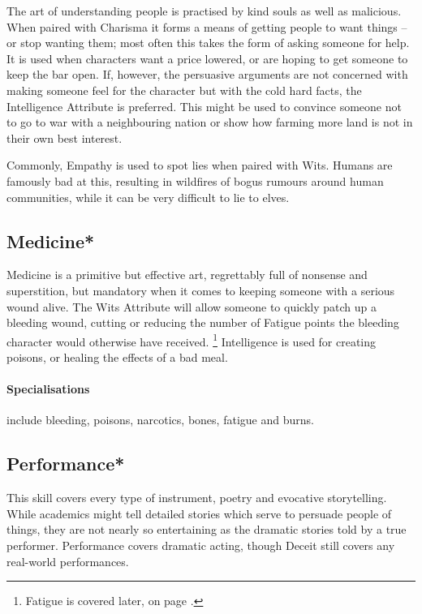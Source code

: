 \begin{multicols}{2}
The art of understanding people is practised by kind souls as well as malicious.
When paired with Charisma it forms a means of getting people to want things -- or stop wanting them; most often this takes the form of asking someone for help.
It is used when characters want a price lowered, or are hoping to get someone to keep the bar open.
If, however, the persuasive arguments are not concerned with making someone feel for the character but with the cold hard facts, the Intelligence Attribute is preferred.
This might be used to convince someone not to go to war with a neighbouring nation or show how farming more land is not in their own best interest.

Commonly, Empathy is used to spot lies when paired with Wits. Humans are famously bad at this, resulting in wildfires of bogus rumours around human communities, while it can be very difficult to lie to elves.

\subsection{Medicine*}

Medicine is a primitive but effective art, regrettably full of nonsense and superstition, but mandatory when it comes to keeping someone with a serious wound alive.
The Wits Attribute will allow someone to quickly patch up a bleeding wound, cutting or reducing the number of Fatigue points the bleeding character would otherwise have received.
\footnote{Fatigue is covered later, on page \pageref{fatigue}.}
Intelligence is used for creating poisons, or healing the effects of a bad meal.

\paragraph{Specialisations} include bleeding, poisons, narcotics, bones, fatigue and burns.

\subsection{Performance*}

This skill covers every type of instrument, poetry and evocative storytelling. While academics might tell detailed stories which serve to persuade people of things, they are not nearly so entertaining as the dramatic stories told by a true performer. Performance covers dramatic acting, though Deceit still covers any real-world performances.


\end{multicols}
